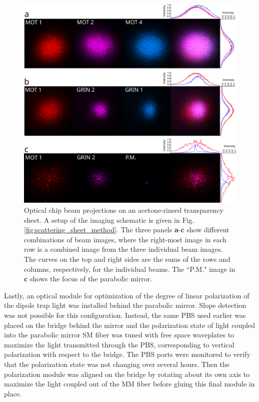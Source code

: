\begin{figure}[t!]
    \centering
    \includegraphics[width=\textwidth]{Images/transparency_sheet_beam_projections.pdf}
    \caption{Optical chip beam projections on an acetone-rinsed transparency sheet. A setup of the imaging schematic is given in Fig. \ref{fig:scattering_sheet_method}. The three panels \textbf{a}-\textbf{c} show different combinations of beam images, where the right-most image in each row is a combined image from the three individual beam images. The curves on the top and right sides are the sums of the rows and columns, respectively, for the individual beams. The ``P.M." image in \textbf{c} shows the focus of the parabolic mirror.}
    \label{fig:final_beam_projections}
\end{figure}

Lastly, an optical module for optimization of the degree of linear polarization of the dipole trap light was installed behind the parabolic mirror. Slope detection was not possible for this configuration. Instead, the same PBS used earlier was placed on the bridge behind the mirror and the polarization state of light coupled into the parabolic mirror SM fiber was tuned with free space waveplates to maximize the light transmitted through the PBS, corresponding to vertical polarization with respect to the bridge. The PBS ports were monitored to verify that the polarization state was not changing over several hours. Then the polarization module was aligned on the bridge by rotating about its own axis to maximize the light coupled out of the MM fiber before gluing this final module in place.

